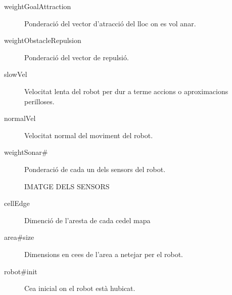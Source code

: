 \begin{description}
  \item[weightGoalAttraction] Ponderació del vector d'atracció del lloc on es vol anar.
  \item[weightObstacleRepulsion] Ponderació del vector de repulsió.

  \item[slowVel] Velocitat lenta del robot per dur a terme accions o aproximacions perilloses.
  \item[normalVel] Velocitat normal del moviment del robot.

  \item[weightSonar\#] Ponderació de cada un dels sensors del robot.

IMATGE DELS SENSORS

\item[cellEdge] Dimenció de l'aresta de cada ce\lgem del mapa
\item[area\#size] Dimensions en ce\lgem es de l'area a netejar per el robot.
\item[robot\#init] Ce\lgem a inicial on el robot està hubicat.
\end{description}
